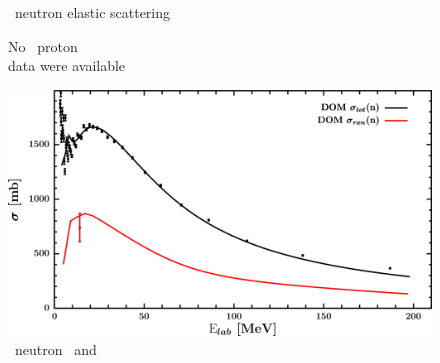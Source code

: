\begin{figure}[hbtp]
\begin{minipage}{0.47\textwidth}
        \caption*{\oEight\ neutron elastic scattering}
        \label{DOMFitData_o18_neutron_elastic}
    \end{minipage}
\end{figure}
\vspace{0.70in}
\begin{figure}[hbtp]
    \centering
    \begin{minipage}{0.47\textwidth}
        \centering
        No \oEight\ proton \rxn\\ data were available
        \label{DOMFitData_o18_proton_inelastic}
    \end{minipage}\hspace{6pt}
    \begin{minipage}{0.47\textwidth}
        \centering
        \includegraphics[width=\textwidth]{figures/o18_neutronInelastic.png}
        \caption*{\oEight\ neutron \rxn\ and \tot}
        \label{DOMFitData_o18_neutron_inelastic}
    \end{minipage}
\end{figure}
\afterpage{\clearpage}
